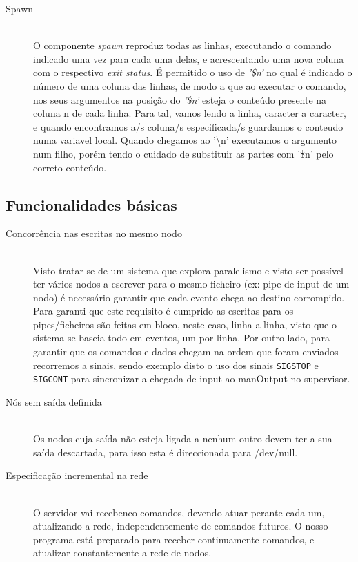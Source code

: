 \documentclass[12pt]{article}
\begin{document}
\begin{description}
\item[Spawn] \hfill \\
    O componente \textit{spawn} reproduz todas as linhas, executando o comando indicado uma vez para cada uma delas, e acrescentando uma nova coluna com o respectivo \textit{exit status}. É permitido o uso de \textit{'\$n'} no qual é indicado o número de uma coluna das linhas, de modo a que ao executar o comando, nos seus argumentos na posição do \textit{'\$n'} esteja o conteúdo presente na coluna n de cada linha. Para tal, vamos lendo a linha, caracter a caracter, e quando encontramos a/s coluna/s especificada/s guardamos o conteudo numa variavel local. Quando chegamos ao '\textbackslash n' executamos o argumento num filho, porém tendo o cuidado de substituir as partes com '\$n' pelo correto conteúdo.  

\end{description} 

\newpage
\subsection{Funcionalidades básicas}
\begin{description} 

\item[Concorrência nas escritas no mesmo nodo] \hfill \\
    Visto tratar-se de um sistema que explora paralelismo e visto ser possível ter vários nodos a escrever para o mesmo ficheiro (ex: pipe de input de um nodo) é necessário garantir que cada evento chega ao destino corrompido. Para garanti que este requisito é cumprido as escritas para os pipes/ficheiros são feitas em bloco, neste caso, linha a linha, visto que o sistema se baseia todo em eventos, um por linha. Por outro lado, para garantir que os comandos e dados chegam na ordem que foram enviados recorremos a sinais, sendo exemplo disto o uso dos sinais \texttt{SIGSTOP} e \texttt{SIGCONT} para sincronizar a chegada de input ao manOutput no supervisor.

\item[Nós sem saída definida] \hfill \\
Os nodos cuja saída não esteja ligada a nenhum outro devem ter a sua saída descartada, para isso esta é direccionada para /dev/null.

\item[Especificação incremental na rede] \hfill \\
O servidor vai recebenco comandos, devendo atuar perante cada um, atualizando a rede, independentemente de comandos futuros. O nosso programa está preparado para receber continuamente comandos, e atualizar constantemente a rede de nodos.

\end{description}
\end{document}
